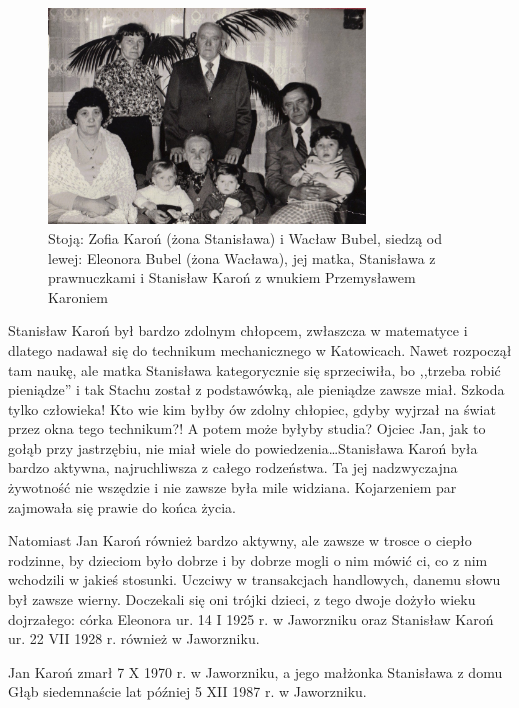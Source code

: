 \begin{figure}
\begin{center}
\includegraphics[width=0.75\textwidth]{zdjecia/eleonora_i_waclaw_bublowie.jpg}
\caption[Eleonora i Wacław Bublowie]{Stoją: Zofia Karoń (żona Stanisława) i Wacław Bubel, siedzą od lewej: Eleonora Bubel (żona Wacława), jej matka, Stanisława z prawnuczkami i Stanisław Karoń z wnukiem Przemysławem Karoniem}
\label{rys:eleonora_i_waclaw_bublowie}
\end{center}
\end{figure}
Stanisław Karoń był bardzo zdolnym chłopcem, zwłaszcza w matematyce i dlatego nadawał się do technikum mechanicznego w Katowicach. Nawet rozpoczął tam naukę, ale matka Stanisława kategorycznie się sprzeciwiła, bo ,,trzeba robić pieniądze'' i tak Stachu został z podstawówką, ale pieniądze zawsze miał. Szkoda tylko człowieka! Kto wie kim byłby ów zdolny chłopiec, gdyby wyjrzał na świat przez okna tego technikum?! A potem może byłyby studia? Ojciec Jan, jak to gołąb przy jastrzębiu, nie miał wiele do powiedzenia\ldots Stanisława Karoń była bardzo aktywna, najruchliwsza z całego rodzeństwa. Ta jej nadzwyczajna żywotność nie wszędzie i nie zawsze była mile widziana. Kojarzeniem par zajmowała się prawie do końca życia.

Natomiast Jan Karoń również bardzo aktywny, ale zawsze w trosce o ciepło rodzinne, by dzieciom było dobrze i by dobrze mogli o nim mówić ci, co z nim wchodzili w jakieś stosunki. Uczciwy w transakcjach handlowych, danemu słowu był zawsze wierny. Doczekali się oni trójki dzieci, z tego dwoje dożyło wieku dojrzałego: córka Eleonora ur. 14 I 1925 r. w Jaworzniku oraz Stanisław Karoń ur. 22 VII 1928 r. również w Jaworzniku.

Jan Karoń zmarł 7 X 1970 r. w Jaworzniku, a jego małżonka Stanisława z domu Głąb siedemnaście lat później 5 XII 1987 r. w Jaworzniku.



